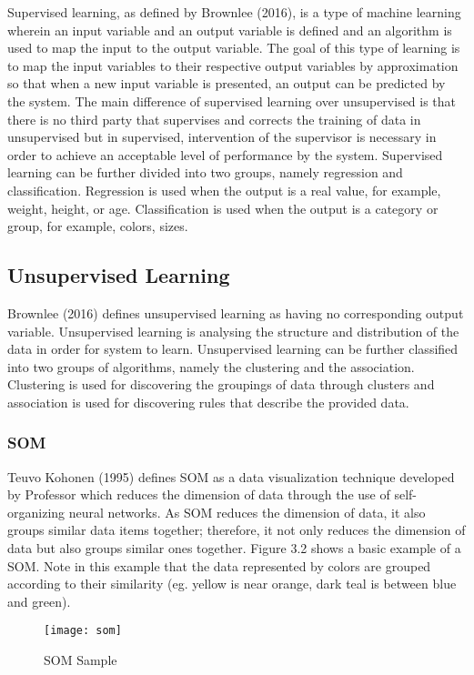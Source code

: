 Supervised learning, as defined by Brownlee (2016), is a type of machine learning wherein an input variable and an output variable is defined and an algorithm is used to map the input to the output variable. The goal of this type of learning is to map the input variables to their respective output variables by approximation so that when a new input variable is presented, an output can be predicted by the system. The main difference of supervised learning over unsupervised is that there is no third party that supervises and corrects the training of data in unsupervised but in supervised, intervention of the supervisor is necessary in order to achieve an acceptable level of performance by the system. Supervised learning can be further divided into two groups, namely regression and classification. Regression is used when the output is a real value, for example, weight, height, or age. Classification is used when the output is a category or group, for example, colors, sizes.

\subsection{Unsupervised Learning}

Brownlee (2016) defines unsupervised learning as having no corresponding output variable. Unsupervised learning is analysing the structure and distribution of the data in order for system to learn. Unsupervised learning can be further classified into two groups of algorithms, namely the clustering and the association. Clustering is used for discovering the groupings of data through clusters and association is used for discovering rules that describe the provided data.

\subsubsection{SOM}
Teuvo Kohonen (1995) defines SOM as a data visualization technique developed by Professor which reduces the dimension of data through the use of self-organizing neural networks. As SOM reduces the dimension of data, it also groups similar data items together; therefore, it not only reduces the dimension of data but also groups similar ones together. Figure 3.2 shows a basic example of a SOM. Note in this example that the data represented by colors are grouped according to their similarity (eg. yellow is near orange, dark teal is between blue and green).

\begin{figure}[h]
\caption{SOM Sample}
\centering
\texttt{[image: som]}
\end{figure}

